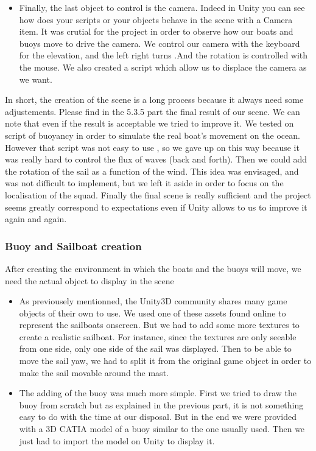 \documentclass[a4paper]{report}
\begin{document}
\begin{itemize}
\item Finally, the last object to control is the camera. Indeed in Unity you can see how does your scripts or your objects behave in the scene with a Camera item. It was crutial for the project in order to observe how our boats and buoys move to drive the camera. We control our camera with the keyboard for the elevation, and the left right turns .And the rotation is controlled with the mouse. We also created a script which allow us to displace the camera as we want.
\end{itemize} 

In short, the creation of the scene is a long process because it always need some adjustements. Please find in the 5.3.5 part the final result of our scene.
We can note that even if the result is acceptable we tried to improve it. We tested on script of buoyancy in order to simulate the real boat's movement on the ocean. However that script was not easy to use , so we gave up on this way because it was really hard to control the flux of waves (back and forth). Then we could add the rotation of the sail as a function of the wind. This idea was envisaged, and was not difficult to implement, but we left it aside in order to focus on the localisation of the squad. Finally the final scene is really sufficient and the project seems greatly correspond to expectations even if Unity allows to us to improve it again and again.

\subsubsection{Buoy and Sailboat creation}
After creating the environment in which the boats and the buoys will move, we need the actual object to display in the scene
\begin{itemize}
\item As previousely mentionned, the Unity3D community shares many game objects of their own to use. We used one of these assets found online to represent the sailboats onscreen. But we had to add some more textures to create a realistic sailboat. For instance, since the textures are only seeable from one side, only one side of the sail was displayed. Then to be able to move the sail yaw, we had to split it from the original game object in order to make the sail movable around the mast.

\item The adding of the buoy was much more simple. First we tried to draw the buoy from scratch but as explained in the previous part, it is not something easy to do with the time at our disposal. But in the end we were provided with a 3D CATIA model of a buoy similar to the one usually used. Then we just had to import the model on Unity to display it.
\end{itemize}
\end{document}
